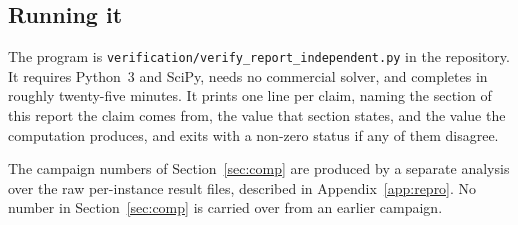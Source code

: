 \subsection{Running it}\label{ssec:verify-running}

The program is \texttt{verification/verify\_report\_independent.py} in the repository.
It requires Python~3 and SciPy, needs no commercial solver, and completes in roughly
twenty-five minutes. It prints one line per claim, naming the section of this report the
claim comes from, the value that section states, and the value the computation
produces, and exits with a non-zero status if any of them disagree.

The campaign numbers of Section~\ref{sec:comp} are produced by a separate analysis over
the raw per-instance result files, described in Appendix~\ref{app:repro}. No number in
Section~\ref{sec:comp} is carried over from an earlier campaign.
